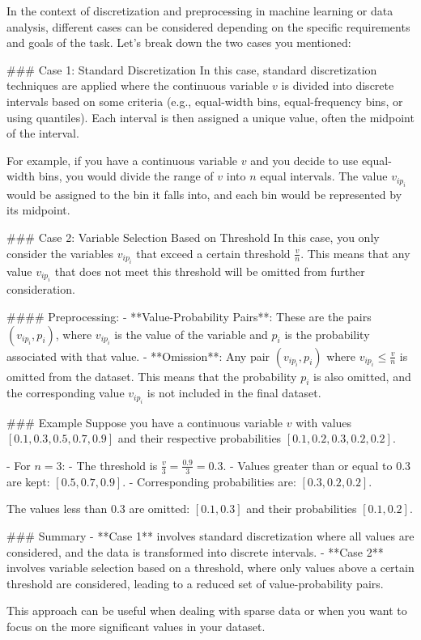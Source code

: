 In the context of discretization and preprocessing in machine learning or data analysis, different cases can be considered depending on the specific requirements and goals of the task. Let's break down the two cases you mentioned:

### Case 1: Standard Discretization
In this case, standard discretization techniques are applied where the continuous variable \( v \) is divided into discrete intervals based on some criteria (e.g., equal-width bins, equal-frequency bins, or using quantiles). Each interval is then assigned a unique value, often the midpoint of the interval.

For example, if you have a continuous variable \( v \) and you decide to use equal-width bins, you would divide the range of \( v \) into \( n \) equal intervals. The value \( v_{ip_i} \) would be assigned to the bin it falls into, and each bin would be represented by its midpoint.

### Case 2: Variable Selection Based on Threshold
In this case, you only consider the variables \( v_{ip_i} \) that exceed a certain threshold \( \frac{v}{n} \). This means that any value \( v_{ip_i} \) that does not meet this threshold will be omitted from further consideration.

#### Preprocessing:
- **Value-Probability Pairs**: These are the pairs \((v_{ip_i}, p_i)\), where \( v_{ip_i } \) is the value of the variable and \( p_i \) is the probability associated with that value.
- **Omission**: Any pair \((v_{ip_i}, p_i)\) where \( v_{ip_i} \leq \frac{v}{n} \) is omitted from the dataset. This means that the probability \( p_i \) is also omitted, and the corresponding value \( v_{ip_i} \) is not included in the final dataset.

### Example
Suppose you have a continuous variable \( v \) with values \( [0.1, 0.3, 0.5, 0.7, 0.9] \) and their respective probabilities \( [0.1, 0.2, 0.3, 0.2, 0.2] \).

- For \( n = 3 \):
  - The threshold is \( \frac{v}{3} = \frac{0.9}{3} = 0.3 \).
  - Values greater than or equal to 0.3 are kept: \( [0.5, 0.7, 0.9] \).
  - Corresponding probabilities are: \( [0.3, 0.2, 0.2] \).

The values less than 0.3 are omitted: \( [0.1, 0.3] \) and their probabilities \( [0.1, 0.2] \).

### Summary
- **Case 1** involves standard discretization where all values are considered, and the data is transformed into discrete intervals.
- **Case 2** involves variable selection based on a threshold, where only values above a certain threshold are considered, leading to a reduced set of value-probability pairs.

This approach can be useful when dealing with sparse data or when you want to focus on the more significant values in your dataset.